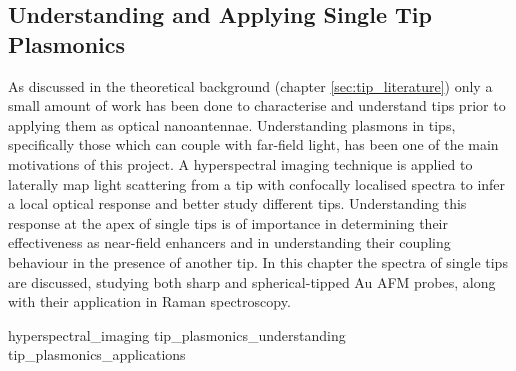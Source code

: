 \documentclass[12pt, a4paper, oneside]{book}
\begin{document}
\begin{singlespace}
\color{white}\chapter{Understanding and Applying Single Tip Plasmonics}
\label{ch:tip_plasmonics}
\end{singlespace}



As discussed in the theoretical background (chapter \ref{sec:tip_literature}) only a small amount of work has been done to characterise and understand tips prior to applying them as optical nanoantennae. Understanding plasmons in tips, specifically those which can couple with far-field light, has been one of the main motivations of this project. A hyperspectral imaging technique is applied to laterally map light scattering from a tip with confocally localised spectra to infer a local optical response and better study different tips. Understanding this response at the apex of single tips is of importance in determining their effectiveness as near-field enhancers and in understanding their coupling behaviour in the presence of another tip. In this chapter the spectra of single tips are discussed, studying both sharp and spherical-tipped Au AFM probes, along with their application in Raman spectroscopy.

{hyperspectral_imaging}
{tip_plasmonics_understanding}
{tip_plasmonics_applications}
\end{document}
